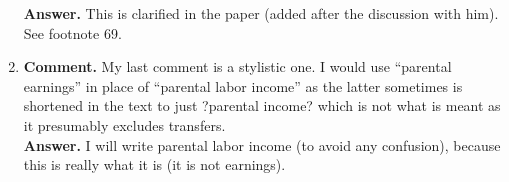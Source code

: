 \begin{enumerate}
\noindent \textbf{Answer.} This is clarified in the paper (added after the discussion with him). See footnote 69.\\

\item 
\noindent \textbf{Comment.} My last comment is a stylistic one. I would use ``parental earnings'' in place of ``parental labor income'' as the latter sometimes is shortened in the text to just ?parental income? which is not what is meant as it presumably excludes transfers.\\ 

\noindent \textbf{Answer.} I will write parental labor income (to avoid any confusion), because this is really what it is (it is not earnings).\\

\end{enumerate}




\singlespace






